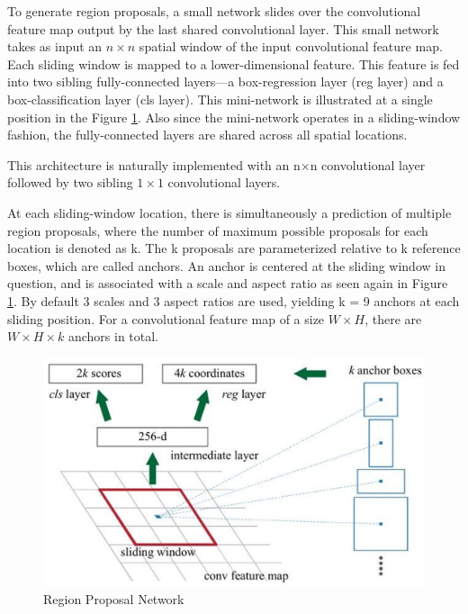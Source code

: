 To generate region proposals, a small network slides over the convolutional feature map output by the last shared convolutional layer. This small
network takes as input an $n \times n$ spatial window of the input convolutional feature map. Each sliding window is mapped to a lower-dimensional feature.
This feature is fed into two sibling fully-connected layers—a box-regression layer (reg layer) and a box-classification layer (cls layer). This mini-network 
is illustrated at a single position in the Figure \ref{fig:anchors}. Also since the mini-network operates in a sliding-window fashion, the 
fully-connected layers are shared across all spatial locations. 

This architecture is naturally implemented with an n×n convolutional layer followed by two sibling $1 \times 1$ convolutional layers. 

\newpage
At each sliding-window location, there is simultaneously a prediction of multiple region proposals, where the number of maximum possible proposals for each location is
denoted as k. The k proposals are parameterized relative to k reference boxes, which are called  anchors. An anchor is centered at the sliding window
in question, and is associated with a scale and aspect ratio as seen again in Figure \ref{fig:anchors}. By default 3 scales and 3 aspect ratios are used, 
yielding k = 9 anchors at each sliding position. For a convolutional feature map of a size $W \times H$, there are $W \times H \times k$ anchors in total.

\begin{figure}
    \centering
    \includegraphics[scale=0.1]{Figures/anchors.jpeg}
    \caption{Region Proposal Network \cite{frrcnn}}
    \label{fig:anchors}
\end{figure}


